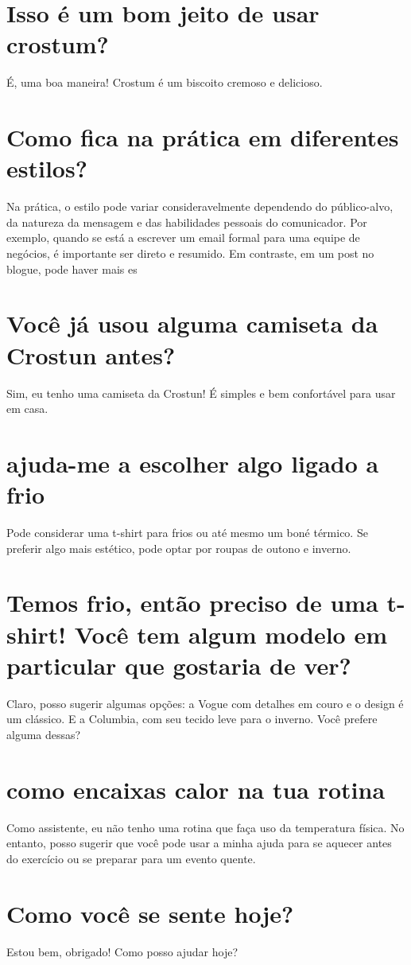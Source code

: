 \documentclass[11pt,a4paper]{article}
\begin{document}
\section{Isso é um bom jeito de usar crostum?}
É, uma boa maneira! Crostum é um biscoito cremoso e delicioso.

\section{Como fica na prática em diferentes estilos?}
Na prática, o estilo pode variar consideravelmente dependendo do público-alvo, da natureza da mensagem e das habilidades pessoais do comunicador. Por exemplo, quando se está a escrever um email formal para uma equipe de negócios, é importante ser direto e resumido. Em contraste, em um post no blogue, pode haver mais es

\section{Você já usou alguma camiseta da Crostun antes?}
Sim, eu tenho uma camiseta da Crostun! É simples e bem confortável para usar em casa.

\section{ajuda-me a escolher algo ligado a frio}
Pode considerar uma t-shirt para frios ou até mesmo um boné térmico. Se preferir algo mais estético, pode optar por roupas de outono e inverno.

\section{Temos frio, então preciso de uma t-shirt! Você tem algum modelo em particular que gostaria de ver?}
Claro, posso sugerir algumas opções: a Vogue com detalhes em couro e o design é um clássico. E a Columbia, com seu tecido leve para o inverno. Você prefere alguma dessas?

\section{como encaixas calor na tua rotina}
Como assistente, eu não tenho uma rotina que faça uso da temperatura física. No entanto, posso sugerir que você pode usar a minha ajuda para se aquecer antes do exercício ou se preparar para um evento quente.

\section{Como você se sente hoje?}
Estou bem, obrigado! Como posso ajudar hoje?
\end{document}
